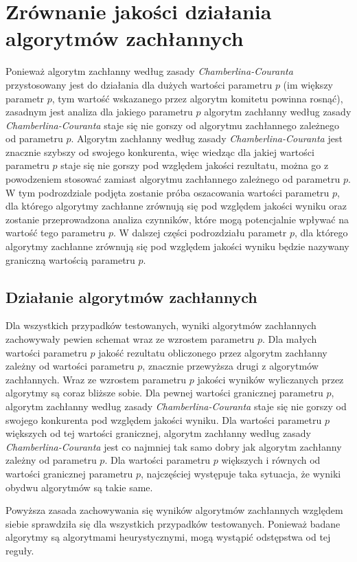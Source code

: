 \documentclass[pdflatex,11pt]{../aghdoc_version2}
\begin{document}
\section{Zrównanie jakości działania algorytmów zachłannych}
Ponieważ algorytm zachłanny według zasady \textit{Chamberlina-Couranta} przystosowany jest do
działania dla dużych wartości parametru $p$ (im większy parametr $p$, tym wartość wskazanego przez algorytm komitetu powinna rosnąć), zasadnym jest analiza dla jakiego parametru $p$ algorytm zachłanny
według zasady \textit{Chamberlina-Couranta} staje się nie gorszy od algorytmu zachłannego zależnego
od parametru $p$. Algorytm zachłanny według zasady \textit{Chamberlina-Couranta} jest znacznie szybszy od swojego konkurenta, więc wiedząc dla jakiej wartości parametru $p$ staje się nie gorszy pod względem jakości rezultatu, można go z powodzeniem stosować zamiast algorytmu zachłannego zależnego od parametru $p$. W tym podrozdziale podjęta zostanie próba oszacowania wartości parametru $p$, dla którego algorytmy zachłanne zrównują się pod względem jakości wyniku oraz zostanie przeprowadzona analiza czynników, które mogą potencjalnie wpływać na wartość tego parametru $p$. W dalszej części podrozdziału parametr $p$, dla którego algorytmy zachłanne zrównują się pod względem jakości wyniku będzie nazywany graniczną wartością parametru $p$.
\subsection{Działanie algorytmów zachłannych}
Dla wszystkich przypadków testowanych, wyniki algorytmów zachłannych zachowywały pewien schemat wraz ze wzrostem parametru $p$. Dla małych wartości parametru $p$ jakość rezultatu obliczonego przez algorytm zachłanny zależny od wartości parametru $p$, znacznie przewyższa drugi z algorytmów zachłannych. Wraz ze wzrostem parametru $p$ jakości wyników wyliczanych przez algorytmy są coraz bliższe sobie. Dla pewnej wartości granicznej parametru $p$, algorytm zachłanny według zasady
\textit{Chamberlina-Couranta} staje się nie gorszy od swojego konkurenta pod względem jakości
wyniku. Dla wartości parametru $p$ większych od tej wartości granicznej, algorytm zachłanny według zasady
\textit{Chamberlina-Couranta} jest co najmniej tak samo dobry jak algorytm zachłanny zależny od
parametru $p$. Dla wartości parametru $p$ większych i równych od wartości granicznej parametru $p$, najczęściej występuje taka sytuacja, że wyniki obydwu algorytmów są takie same.

Powyższa zasada zachowywania się wyników algorytmów zachłannych względem siebie sprawdziła się dla wszystkich przypadków testowanych. Ponieważ badane algorytmy są algorytmami heurystycznymi, mogą wystąpić odstępstwa od tej reguły.
\end{document}
